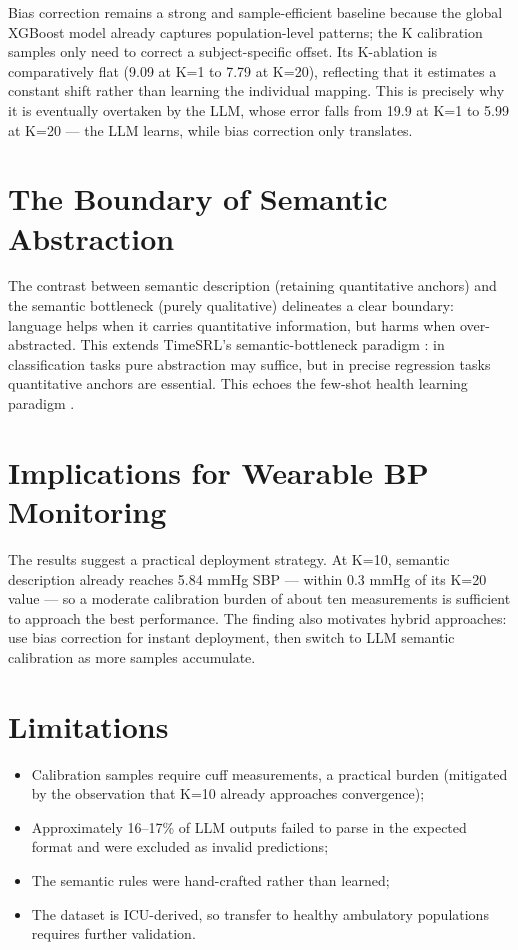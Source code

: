 Bias correction remains a strong and sample-efficient baseline because the global XGBoost model already captures population-level patterns; the K calibration samples only need to correct a subject-specific offset. Its K-ablation is comparatively flat (9.09 at K=1 to 7.79 at K=20), reflecting that it estimates a constant shift rather than learning the individual mapping. This is precisely why it is eventually overtaken by the LLM, whose error falls from 19.9 at K=1 to 5.99 at K=20 --- the LLM learns, while bias correction only translates.

\section{The Boundary of Semantic Abstraction}

The contrast between semantic description (retaining quantitative anchors) and the semantic bottleneck (purely qualitative) delineates a clear boundary: language helps when it carries quantitative information, but harms when over-abstracted. This extends TimeSRL's semantic-bottleneck paradigm \citep{timesrl2026}: in classification tasks pure abstraction may suffice, but in precise regression tasks quantitative anchors are essential. This echoes the few-shot health learning paradigm \citep{fewshothealth2023}.

\section{Implications for Wearable BP Monitoring}

The results suggest a practical deployment strategy. At K=10, semantic description already reaches 5.84 mmHg SBP --- within 0.3 mmHg of its K=20 value --- so a moderate calibration burden of about ten measurements is sufficient to approach the best performance. The finding also motivates hybrid approaches: use bias correction for instant deployment, then switch to LLM semantic calibration as more samples accumulate.

\section{Limitations}

\begin{itemize}
  \item Calibration samples require cuff measurements, a practical burden (mitigated by the observation that K=10 already approaches convergence);
  \item Approximately 16--17\% of LLM outputs failed to parse in the expected format and were excluded as invalid predictions;
  \item The semantic rules were hand-crafted rather than learned;
  \item The dataset is ICU-derived, so transfer to healthy ambulatory populations requires further validation.
\end{itemize}
